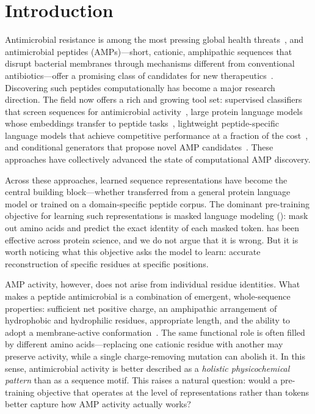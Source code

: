 \section{Introduction}
\label{sec:introduction}

Antimicrobial resistance is among the most pressing global health
threats~\citep{who2019,oneill2016}, and antimicrobial peptides (AMPs)---short,
cationic, amphipathic sequences that disrupt bacterial membranes through
mechanisms different from conventional antibiotics---offer a promising class
of candidates for new therapeutics~\citep{zasloff2002,brogden2005,hancock2006}.
Discovering such peptides computationally has become a major research
direction.
The field now offers a rich and growing tool set:
supervised classifiers that screen sequences for antimicrobial
activity~\citep{amplify,ampscanner,iamppred,ampbert},
large protein language models whose embeddings transfer to peptide
tasks~\citep{esm2,prottrans,unirep},
lightweight peptide-specific language models that achieve competitive
performance at a fraction of the cost~\citep{pepbert,llamp,peptidebert},
and conditional generators that propose novel AMP
candidates~\citep{hydramp,diffamp,pandi2023,kppepgen,pepvae}.
These approaches have collectively advanced the state of computational AMP
discovery.

Across these approaches, learned sequence representations have become the
central building block---whether transferred from a general protein language
model or trained on a domain-specific peptide corpus.
The dominant pre-training objective for learning such representations is
masked language modeling (\mlmenc{}): mask out amino acids and predict the
exact identity of each masked token.
\mlmenc{} has been effective across protein science, and we do not argue that
it is wrong.
But it is worth noticing what this objective asks the model to learn:
accurate reconstruction of specific residues at specific positions.

AMP activity, however, does not arise from individual residue identities.
What makes a peptide antimicrobial is a combination of emergent,
whole-sequence properties: sufficient net positive charge, an amphipathic
arrangement of hydrophobic and hydrophilic residues, appropriate length, and
the ability to adopt a membrane-active
conformation~\citep{fjell2012,hancock2006}.
The same functional role is often filled by different amino acids---replacing
one cationic residue with another may preserve activity, while a single
charge-removing mutation can abolish it.
In this sense, antimicrobial activity is better described as a
\emph{holistic physicochemical pattern} than as a sequence motif.
This raises a natural question: would a pre-training objective that operates
at the level of representations rather than tokens better capture how AMP
activity actually works?

